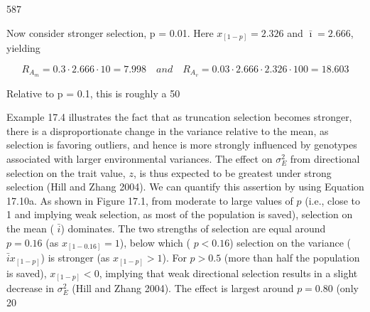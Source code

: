\documentclass{article}
\begin{document}
587

Now consider stronger selection, p = 0.01. Here  $ x_{[1-p]} = 2.326 $ and  $ \bar{\imath} = 2.666 $, yielding

\begin{equation}
R_{A_{m}}=0.3\cdot2.666\cdot10=7.998\quad and\quad R_{A_{v}}=0.03\cdot2.666\cdot2.326\cdot100=18.603
\end{equation}

Relative to p = 0.1, this is roughly a 50%

Example 17.4 illustrates the fact that as truncation selection becomes stronger, there is a disproportionate change in the variance relative to the mean, as selection is favoring outliers, and hence is more strongly influenced by genotypes associated with larger environmental variances. The effect on  $ \sigma_E^2 $ from directional selection on the trait value,  $ z $, is thus expected to be greatest under strong selection (Hill and Zhang 2004). We can quantify this assertion by using Equation 17.10a. As shown in Figure 17.1, from moderate to large values of  $ p $ (i.e., close to 1 and implying weak selection, as most of the population is saved), selection on the mean ( $ \bar{i} $) dominates. The two strengths of selection are equal around  $ p = 0.16 $ (as  $ x_{[1-0.16]} = 1 $), below which ( $ p < 0.16 $) selection on the variance ( $ \bar{i}x_{[1-p]} $) is stronger (as  $ x_{[1-p]} > 1 $). For  $ p > 0.5 $ (more than half the population is saved),  $ x_{[1-p]} < 0 $, implying that weak directional selection results in a slight decrease in  $ \sigma_E^2 $ (Hill and Zhang 2004). The effect is largest around  $ p = 0.80 $ (only 20%
\end{document}

